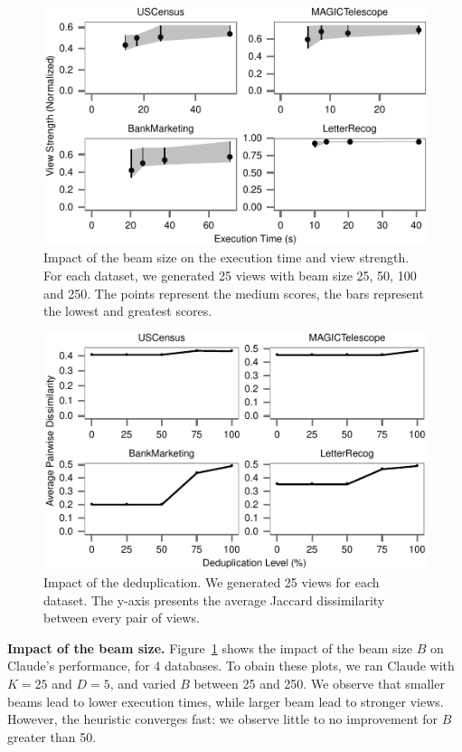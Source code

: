 \begin{figure}[t!]
\centering
\includegraphics[width=\columnwidth]{plots/view-vary-beam}
\caption{Impact of the beam size on the execution time and view strength. For
each dataset, we generated 25 views with beam size 25, 50, 100 and 250. The
points represent the medium scores, the bars represent the lowest and greatest
scores.}
\label{pic:view-beam}
\end{figure}
\begin{figure}[t!]
\centering
\includegraphics[width=\columnwidth]{plots/view-vary-diversification}
\caption{Impact of the deduplication. We generated 25 views for each dataset.
The y-axis presents the average Jaccard dissimilarity between every pair of
views.}
\label{pic:view-diversification}
\end{figure}
\textbf{Impact of the beam size.} Figure~\ref{pic:view-beam} shows the impact
of the beam size $B$ on Claude's performance, for 4 databases. To obain these
plots, we ran Claude with $K=25$ and $D=5$, and varied $B$ between 25 and 250.
We observe that smaller beams lead to lower execution times, while larger beam
lead to stronger views. However, the heuristic converges fast: we observe
little to no improvement for $B$ greater than 50.

